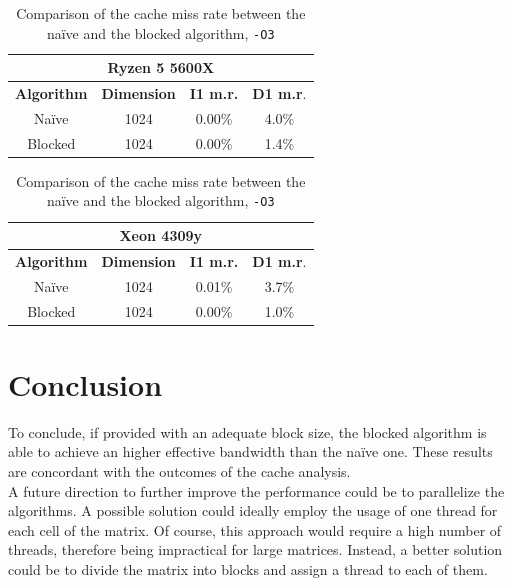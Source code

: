 \documentclass{article}
\begin{document}
\begin{table}[h]
    \centering
    \begin{tabular}{|c|c|c|c|}
        \hline
        \multicolumn{4}{|c|}{\textbf{Ryzen 5 5600X}} \\ 
        \hline
        \textbf{Algorithm} & \textbf{Dimension} & \textbf{I1 m.r.} & \textbf{D1 m.r}. \\ \hline
        Na\"{i}ve & 1024        & 0.00\%       & 4.0\%        \\ \hline
        Blocked  & 1024        & 0.00\%       & 1.4\%        \\ \hline
    \end{tabular}
    \hspace{2em}
    \begin{tabular}{|c|c|c|c|}
        \hline
        \multicolumn{4}{|c|}{\textbf{Xeon 4309y}} \\ 
        \hline
        \textbf{Algorithm} & \textbf{Dimension} & \textbf{I1 m.r.} & \textbf{D1 m.r}. \\ \hline
        Na\"{i}ve & 1024        & 0.01\%       & 3.7\%        \\ \hline
        Blocked  & 1024        & 0.00\%       & 1.0\%        \\ \hline
    \end{tabular}
    \caption{Comparison of the cache miss rate between the na\"{i}ve and the blocked algorithm, \texttt{-O3}}
    \label{tab:blocked_cache_miss}
\end{table}
\section{Conclusion}
To conclude, if provided with an adequate block size, the blocked algorithm is able to achieve an higher effective bandwidth than the na\"{i}ve one.
These results are concordant with the outcomes of the cache analysis. \\
A future direction to further improve the performance could be to parallelize the algorithms. A possible solution could ideally employ the usage of one thread 
for each cell of the matrix. Of course, this approach would require a high number of threads, therefore being impractical for large matrices. Instead, a better solution 
could be to divide the matrix into blocks and assign a thread to each of them.
\end{document}
